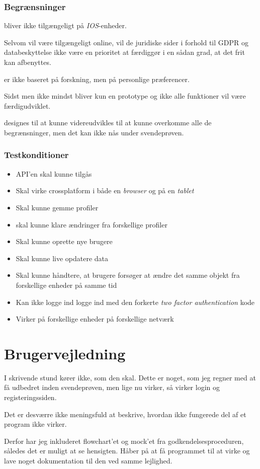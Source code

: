 \documentclass{report}
\begin{document}
\subsection{Begrænsninger}

\projectName{} bliver ikke tilgængeligt på \textit{IOS}-enheder.

Selvom \projectName{} vil være tilgængeligt online, vil de juridiske sider i forhold til GDPR og databeskyttelse ikke være en prioritet at færdiggør i en sådan grad, at det frit kan afbenyttes.

\projectName{} er ikke baseret på forskning, men på personlige præferencer.

Sidst men ikke mindst bliver \projectName{} kun en prototype og ikke alle funktioner vil være færdigudviklet.

\projectName{} designes til at kunne videreudvikles til at kunne overkomme alle de begrænsninger, men det kan ikke nås under svendeprøven.

\subsection{Testkonditioner}

\begin{itemize}
\item API'en skal kunne tilgås
\item Skal virke crossplatform i både en \textit{browser} og på en \textit{tablet}
\item Skal kunne gemme profiler
\item skal kunne klare ændringer fra forskellige profiler
\item Skal kunne oprette nye brugere
\item Skal kunne live opdatere data
\item Skal kunne håndtere, at brugere forsøger at ændre det samme objekt fra forskellige enheder på samme tid
\item Kan ikke logge ind logge ind med den forkerte \textit{two factor authentication} kode
\item Virker på forskellige enheder på forskellige netværk
\end{itemize}

\chapter{Brugervejledning}

I skrivende stund kører ikke, som den skal. Dette er noget, som jeg regner med at få udbedret inden svendeprøven, men lige nu virker, så virker login og registeringssiden.\par{}
Det er desværre ikke meningsfuld at beskrive, hvordan ikke fungerede del af et program ikke virker.\par{}
Derfor har jeg inkluderet flowchart'et og mock'et fra godkendelsesproceduren, således det er muligt at se hensigten. Håber på at få programmet til at virke og lave noget dokumentation til den ved samme lejlighed.\par{}
\end{document}
